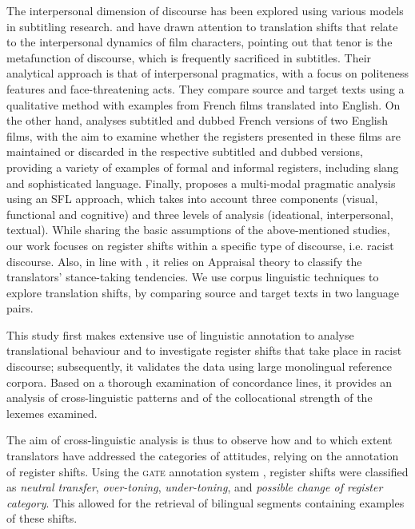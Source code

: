 \documentclass[output=paper]{LSP/langsci}
\begin{document}
The interpersonal dimension of discourse has been explored using various models in subtitling research. \citet[78--96]{Hatim1997} and \citet{Mason2001} have drawn attention to translation shifts that relate to the interpersonal dynamics of film characters, pointing out that tenor is the metafunction of discourse, which is frequently sacrificed in subtitles. Their analytical approach is that of interpersonal pragmatics, with a focus on politeness features and face-threatening acts. They compare source and target texts using a qualitative method with examples from French films translated into English. On the other hand, \citet{Pettit2005} analyses subtitled and dubbed French versions of two English films, with the aim to examine whether the registers presented in these films are maintained or discarded in the respective subtitled and dubbed versions, providing a variety of examples of formal and informal registers, including slang and sophisticated language. Finally, \citet{Mubenga2009} proposes a multi-modal pragmatic analysis using an SFL approach, which takes into account three components (visual, functional and cognitive) and three levels of analysis (ideational, interpersonal, textual). While sharing the basic assumptions of the above-mentioned studies, our work focuses on register shifts within a specific type of discourse, i.e. racist discourse. Also, in line with \citet{Munday2012}, it relies on Appraisal theory to classify the translators' stance-taking tendencies. We use corpus linguistic techniques to explore translation shifts, by comparing source and target texts in two language pairs.

This study first makes extensive use of linguistic annotation to analyse translational behaviour and to investigate register shifts that take place in racist discourse; subsequently, it validates the data using large monolingual reference corpora. Based on a thorough examination of concordance lines, it provides an analysis of cross-linguistic patterns and of the collocational strength of the lexemes examined.

The aim of cross-linguistic analysis is thus to observe how and to which extent translators have addressed the categories of attitudes, relying on the annotation of register shifts. Using the \textsc{gate} annotation system \citep{Cunningham2002}, register shifts were classified as \textit{neutral transfer}, \textit{over-toning}, \textit{under-toning}, and \textit{possible change of register category}. This allowed for the retrieval of bilingual segments containing examples of these shifts.
\end{document}
